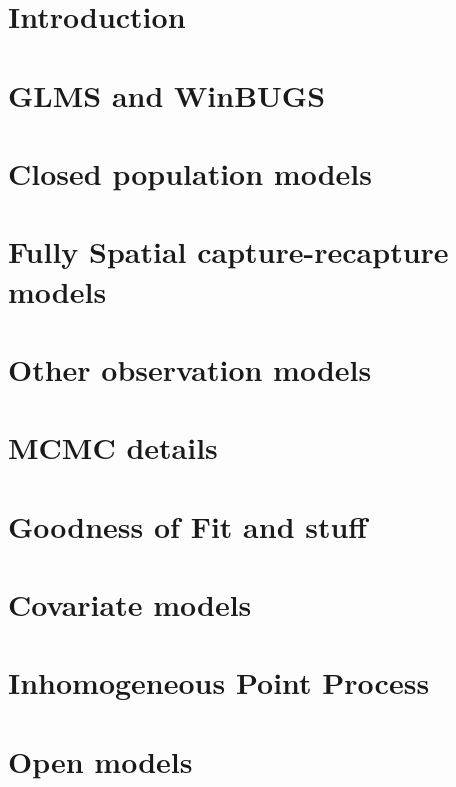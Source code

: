 \documentclass{book}
\begin{document}

%
\chapter{Introduction}
\label{chapt.intro}

\chapter{GLMS and WinBUGS}
\label{chapt.glms}

\chapter{Closed population models}
\label{chapt.closed}

\chapter{Fully Spatial capture-recapture models}
\label{chapt.scr0}

\chapter{Other observation models}
\label{chapt.poisson}





\chapter{MCMC details}
\label{chapt.mcmc}

\chapter{Goodness of Fit and stuff}
\label{chapt.gof}

\chapter{Covariate models}
\label{chapt.covariates}

\chapter{Inhomogeneous Point Process}
\label{chapt.ipp}

\chapter{Open models}
\label{chapt.open}






\end{document}
